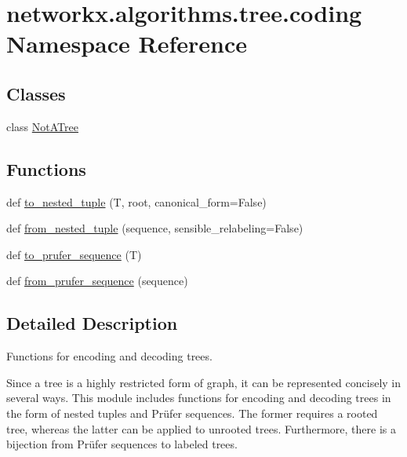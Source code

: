 \hypertarget{namespacenetworkx_1_1algorithms_1_1tree_1_1coding}{}\section{networkx.\+algorithms.\+tree.\+coding Namespace Reference}
\label{namespacenetworkx_1_1algorithms_1_1tree_1_1coding}
\subsection*{Classes}
\begin{DoxyCompactItemize}
\item 
class \hyperlink{classnetworkx_1_1algorithms_1_1tree_1_1coding_1_1NotATree}{Not\+A\+Tree}
\end{DoxyCompactItemize}
\subsection*{Functions}
\begin{DoxyCompactItemize}
\item 
def \hyperlink{namespacenetworkx_1_1algorithms_1_1tree_1_1coding_a3dc54058ee94eb611a8d06e54240ff76}{to\+\_\+nested\+\_\+tuple} (T, root, canonical\+\_\+form=False)
\item 
def \hyperlink{namespacenetworkx_1_1algorithms_1_1tree_1_1coding_ad471f3f6704b4cc06758b36a98a69e18}{from\+\_\+nested\+\_\+tuple} (sequence, sensible\+\_\+relabeling=False)
\item 
def \hyperlink{namespacenetworkx_1_1algorithms_1_1tree_1_1coding_ab1246f353ea54edc4a894ccfad9ae520}{to\+\_\+prufer\+\_\+sequence} (T)
\item 
def \hyperlink{namespacenetworkx_1_1algorithms_1_1tree_1_1coding_a9ab0a5a2689792787678a30ff1cb9ef7}{from\+\_\+prufer\+\_\+sequence} (sequence)
\end{DoxyCompactItemize}


\subsection{Detailed Description}
\begin{DoxyVerb}Functions for encoding and decoding trees.

Since a tree is a highly restricted form of graph, it can be represented
concisely in several ways. This module includes functions for encoding
and decoding trees in the form of nested tuples and Prüfer
sequences. The former requires a rooted tree, whereas the latter can be
applied to unrooted trees. Furthermore, there is a bijection from Prüfer
sequences to labeled trees.\end{DoxyVerb}
 

